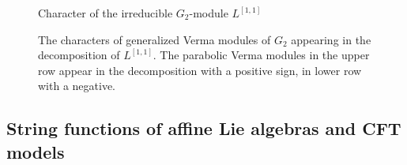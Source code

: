 \documentclass[preprint,12pt]{elsarticle}
\begin{document}
\begin{figure}[h]
  \noindent{}
  \caption{Character of the irreducible $G_{2}$-module $L^{[1,1]}$}
  \label{branching-bgg}
\end{figure}
\begin{figure}[h]
  \noindent{}
  \caption{The characters of  generalized Verma modules of $G_{2}$ appearing in the decomposition of $L^{[1,1]}$. The parabolic Verma modules in the upper row appear in the decomposition with a positive sign, in  lower row with a negative.}
  \label{g2-pverma}
\end{figure}

\subsection{String functions of affine Lie algebras and CFT models}
\label{sec:string-funct-affine}
\end{document}
